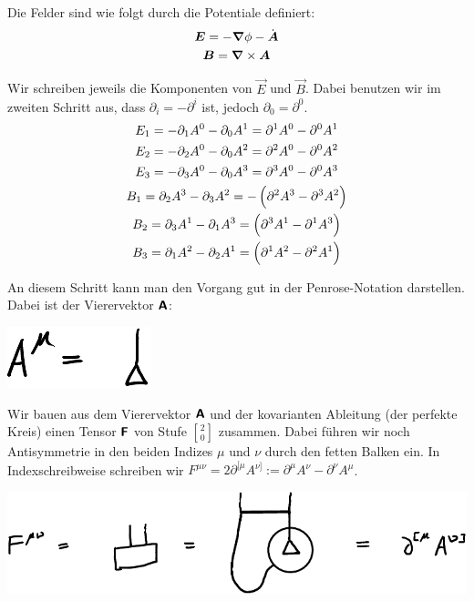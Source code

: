 Die Felder sind wie folgt durch die Potentiale definiert:
\begin{gather*}
	\boldsymbol{E} = - \boldsymbol{\nabla} \phi - \dot{\boldsymbol{A}} \\
	\boldsymbol{B} = \boldsymbol{\nabla} \times \boldsymbol{A}
\end{gather*}

Wir schreiben jeweils die Komponenten von $\vec E$ und $\vec B$. Dabei benutzen
wir im zweiten Schritt aus, dass $\partial_i = - \partial^i$ ist, jedoch
$\partial_0 = \partial^0$.
\begin{gather*}
	E_1
	= - \partial_1 A^0 - \partial_0 A^1
	= \partial^1 A^0 - \partial^0 A^1
	\\
	E_2
	= - \partial_2 A^0 - \partial_0 A^2
	= \partial^2 A^0 - \partial^0 A^2
	\\
	E_3
	= - \partial_3 A^0 - \partial_0 A^3
	= \partial^3 A^0 - \partial^0 A^3
	\\
	B_1
	= \partial_2 A^3 - \partial_3 A^2
	= -\del{\partial^2 A^3 - \partial^3 A^2}
	\\
	B_2
	= \partial_3 A^1 - \partial_1 A^3
	= \del{\partial^3 A^1 - \partial^1 A^3}
	\\
	B_3
	= \partial_1 A^2 - \partial_2 A^1
	= \del{\partial^1 A^2 - \partial^2 A^1}
	\\
\end{gather*}

An diesem Schritt kann man den Vorgang gut in der Penrose-Notation
\cite{penrose-road_to_reality} darstellen.  Dabei ist der Vierervektor $\boldsymbol{\mathsf{A}}$:
\begin{center}
	\includegraphics{H1-Penrose-2-crop.pdf}
\end{center}

Wir bauen aus dem Vierervektor $\boldsymbol{\mathsf{A}}$ und der kovarianten Ableitung (der
perfekte Kreis) einen Tensor $\boldsymbol{\mathsf{F}}$ von Stufe ${2 \brack 0}$ zusammen. Dabei
führen wir noch Antisymmetrie in den beiden Indizes $\mu$ und $\nu$ durch den
fetten Balken ein. In Indexschreibweise schreiben wir $F^{\mu\nu} =
2 \partial^{[\mu} A^{\nu]} := \partial^\mu A^\nu - \partial^\nu A^\mu$.
\begin{center}
	\includegraphics{H1-Penrose-1-crop.pdf}
\end{center}

